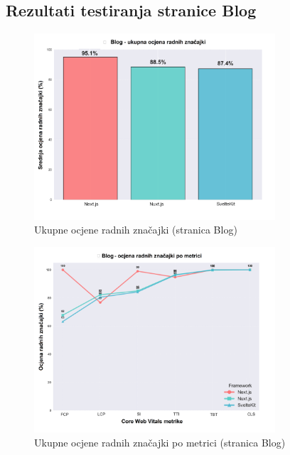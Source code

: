 
\subsection{Rezultati testiranja stranice Blog}
\label{sec:rezultati-blog}

\begin{figure}[H]
    \centering
    \includegraphics[width=0.8\textwidth]{slike/rezultati/blog/blog_framework_overall_performance.png}
    \caption{Ukupne ocjene radnih značajki (stranica Blog)}
    \label{fig:testiranje-blog-ukupne-performanse}
\end{figure}

\begin{figure}[H]
    \centering
    \includegraphics[width=0.8\textwidth]{slike/rezultati/blog/blog_performance_by_metric.png}
    \caption{Ukupne ocjene radnih značajki po metrici (stranica Blog)}
    \label{fig:testiranje-blog-performanse-po-metrici}
\end{figure}

